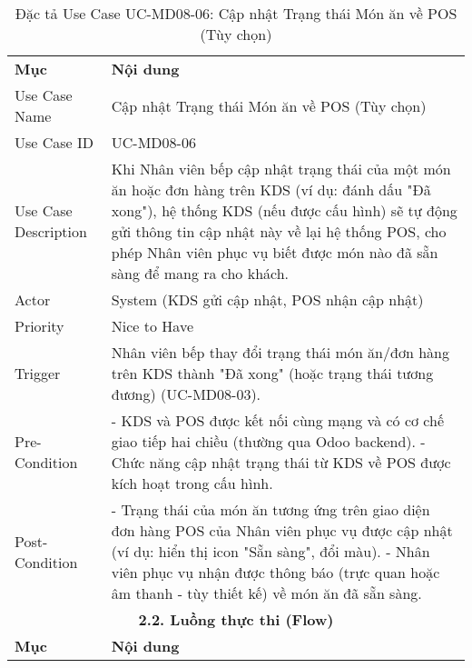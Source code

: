 \begin{longtable}{|m{4cm}|p{11cm}|}
\caption{Đặc tả Use Case UC-MD08-06: Cập nhật Trạng thái Món ăn về POS (Tùy chọn)} \label{tab:uc_md08_06} \\
\hline

\endhead %
\hline
\endfoot %
\hline
\endlastfoot %
\multicolumn{2}{|c|}{\textbf{2.1. Tóm tắt (Summary)}} \\
\hline
\textbf{Mục} & \textbf{Nội dung} \\
\hline
Use Case Name & Cập nhật Trạng thái Món ăn về POS (Tùy chọn) \\
\hline
Use Case ID & UC-MD08-06 \\
\hline
Use Case Description & Khi Nhân viên bếp cập nhật trạng thái của một món ăn hoặc đơn hàng trên KDS (ví dụ: đánh dấu "Đã xong"), hệ thống KDS (nếu được cấu hình) sẽ tự động gửi thông tin cập nhật này về lại hệ thống POS, cho phép Nhân viên phục vụ biết được món nào đã sẵn sàng để mang ra cho khách. \\
\hline
Actor & System (KDS gửi cập nhật, POS nhận cập nhật) \\
\hline
Priority & Nice to Have \\
\hline
Trigger & Nhân viên bếp thay đổi trạng thái món ăn/đơn hàng trên KDS thành "Đã xong" (hoặc trạng thái tương đương) (UC-MD08-03). \\
\hline
Pre-Condition & - KDS và POS được kết nối cùng mạng và có cơ chế giao tiếp hai chiều (thường qua Odoo backend). \newline - Chức năng cập nhật trạng thái từ KDS về POS được kích hoạt trong cấu hình. \\
\hline
Post-Condition & - Trạng thái của món ăn tương ứng trên giao diện đơn hàng POS của Nhân viên phục vụ được cập nhật (ví dụ: hiển thị icon "Sẵn sàng", đổi màu). \newline - Nhân viên phục vụ nhận được thông báo (trực quan hoặc âm thanh - tùy thiết kế) về món ăn đã sẵn sàng. \\
\hline
\multicolumn{2}{|c|}{\textbf{2.2. Luồng thực thi (Flow)}} \\
\hline
\textbf{Mục} & \textbf{Nội dung} \\
\hline

\end{longtable}
